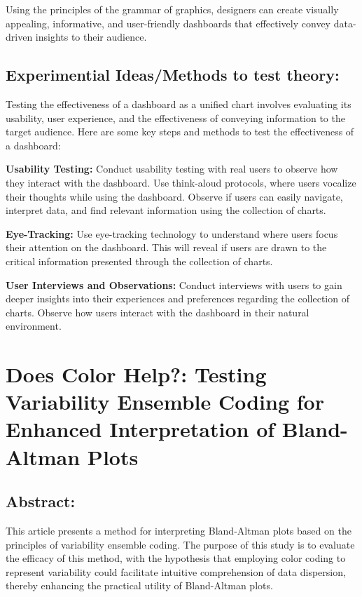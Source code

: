 \documentclass[print]{nuthesis}
\begin{document}
Using the principles of the grammar of graphics, designers can create visually appealing, informative, and user-friendly dashboards that effectively convey data-driven insights to their audience.

\hypertarget{experimential-ideasmethods-to-test-theory}{%
\section{Experimential Ideas/Methods to test theory:}\label{experimential-ideasmethods-to-test-theory}}

Testing the effectiveness of a dashboard as a unified chart involves evaluating its usability, user experience, and the effectiveness of conveying information to the target audience.
Here are some key steps and methods to test the effectiveness of a dashboard:

\textbf{Usability Testing:}
Conduct usability testing with real users to observe how they interact with the dashboard.
Use think-aloud protocols, where users vocalize their thoughts while using the dashboard.
Observe if users can easily navigate, interpret data, and find relevant information using the collection of charts.

\textbf{Eye-Tracking:}
Use eye-tracking technology to understand where users focus their attention on the dashboard.
This will reveal if users are drawn to the critical information presented through the collection of charts.

\textbf{User Interviews and Observations:}
Conduct interviews with users to gain deeper insights into their experiences and preferences regarding the collection of charts.
Observe how users interact with the dashboard in their natural environment.

\hypertarget{ref-labels}{%
\chapter{Does Color Help?: Testing Variability Ensemble Coding for Enhanced Interpretation of Bland-Altman Plots}\label{ref-labels}}

\hypertarget{abstract-2}{%
\section{Abstract:}\label{abstract-2}}

This article presents a method for interpreting Bland-Altman plots based on the principles of variability ensemble coding.
The purpose of this study is to evaluate the efficacy of this method, with the hypothesis that employing color coding to represent variability could facilitate intuitive comprehension of data dispersion, thereby enhancing the practical utility of Bland-Altman plots.
\end{document}
